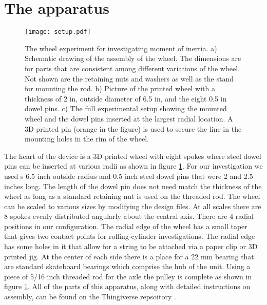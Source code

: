 \documentclass[prb,preprint]{revtex4-1}
\begin{document}
\section{The apparatus}
\begin{figure}[tph]
\begin{centering}
  \texttt{[image: setup.pdf]}
     \caption{The wheel experiment for investigating moment of inertia.  a) Schematic drawing of the assembly of the wheel.  The dimensions are for parts that are consistent among different variations of the wheel. Not shown are the retaining nuts and washers as well as the stand for mounting the rod. b) Picture of the printed wheel with a thickness of 2 in, outside diameter of 6.5 in,  and the eight 0.5 in dowel pins. c) The full experimental setup showing the mounted wheel and the dowel pins inserted at the largest radial location. A 3D printed pin (orange in the figure) is used to secure the line in the mounting holes in the rim of the wheel. }
     \end{centering}
     \label{setup}
\end{figure}

The heart of the device is a 3D printed wheel with eight spokes where steel dowel pins can be inserted at various radii as shown in figure \ref{setup}.   For our investigation we used s $6.5$ inch outside radius and $0.5$ inch steel dowel pins that were 2 and 2.5 inches long. The length of the dowel pin does not need match the thickness of the wheel as long as a standard retaining nut is used on the threaded rod.  The wheel can be scaled to various sizes by modifying the design files.  At all scales there are 8 spokes evenly distributed angularly about the central axis. There are 4 radial positions in our configuration.  %
The radial edge of the wheel has a small taper that gives two contact points for rolling-cylinder investigations. The radial edge has some holes in it that allow for a string to be attached via a paper clip or 3D printed jig. At the center of each side there is a place for a 22 mm bearing that are standard skateboard bearings which comprise the hub of the unit.  Using a piece of 5/16 inch threaded rod for the axle the pulley is complete as shown in figure \ref{setup}.  All of the parts of this apparatus, along with detailed instructions on assembly, can be found on the Thingiverse repsoitory \cite{Thingiverse}.
\end{document}
